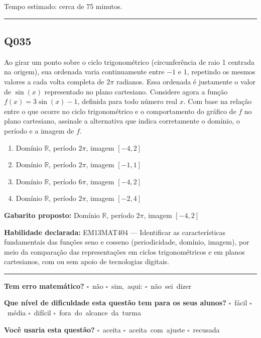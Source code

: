 \documentclass[11pt,a4paper]{article}
\begin{document}
Tempo estimado: cerca de 75 minutos.
\bigskip\hrule\bigskip
\begin{samepage}
\subsection*{Q035}
Ao girar um ponto sobre o ciclo trigonométrico (circunferência de raio 1 centrada na origem), sua ordenada varia continuamente entre $-1$ e $1$, repetindo os mesmos valores a cada volta completa de $2\pi$ radianos. Essa ordenada é justamente o valor de $\sin(x)$ representado no plano cartesiano. Considere agora a função $f(x) = 3\sin(x) - 1$, definida para todo número real $x$. Com base na relação entre o que ocorre no ciclo trigonométrico e o comportamento do gráfico de $f$ no plano cartesiano, assinale a alternativa que indica corretamente o domínio, o período e a imagem de $f$.
\begin{enumerate}[label=(\alph*),nosep,leftmargin=*]
\item Domínio $\mathbb{R}$, período $2\pi$, imagem $[-4, 2]$
\item Domínio $\mathbb{R}$, período $2\pi$, imagem $[-1, 1]$
\item Domínio $\mathbb{R}$, período $6\pi$, imagem $[-4, 2]$
\item Domínio $\mathbb{R}$, período $2\pi$, imagem $[-2, 4]$
\end{enumerate}

\textbf{Gabarito proposto:} Domínio $\mathbb{R}$, período $2\pi$, imagem $[-4, 2]$

\textbf{Habilidade declarada:} EM13MAT404 --- Identificar as características fundamentais das funções seno e cosseno (periodicidade, domínio, imagem), por meio da comparação das representações em ciclos trigonométricos e em planos cartesianos, com ou sem apoio de tecnologias digitais.
\end{samepage}

\noindent\rule{\linewidth}{0.4pt}
\textbf{Tem erro matemático?}\quad
\mbox{$\square$~não} \quad \mbox{$\square$~sim, aqui:} \underline{\hspace{5cm}}
\quad \mbox{$\square$~não sei dizer}

\textbf{Que nível de dificuldade esta questão tem para os seus alunos?}\quad
\mbox{$\square$~fácil} \quad \mbox{$\square$~média} \quad
\mbox{$\square$~difícil} \quad \mbox{$\square$~fora do alcance da turma}

\textbf{Você usaria esta questão?}\quad
\mbox{$\square$~aceita} \quad \mbox{$\square$~aceita com ajuste} \quad
\mbox{$\square$~recusada}
\end{document}
